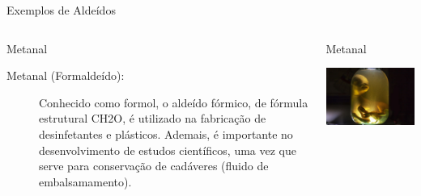 \documentclass[presentation,professionalfonts,aspectratio=169]{beamer}
\begin{document}
\begin{frame}[label={sec:org4ec7605}]{Exemplos de Aldeídos}
\begin{columns}
\begin{column}{0.45\columnwidth}
\begin{block}{Metanal}
\begin{description}
\item[{Metanal (Formaldeído):}] Conhecido como formol, o aldeído fórmico, de fórmula estrutural CH2O, é utilizado na fabricação de desinfetantes e plásticos. Ademais, é importante no desenvolvimento de estudos científicos, uma vez que serve para conservação de cadáveres (fluido de embalsamamento).
\end{description}
\end{block}
\end{column}


\begin{column}{0.45\columnwidth}
\begin{block}{Metanal}
\begin{center}
\includegraphics[width=.9\linewidth]{QO/FuncoesOxigenadas/formol.jpg}
\end{center}
\end{block}
\end{column}
\end{columns}
\end{frame}
\end{document}
